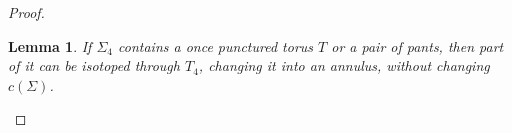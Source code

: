 \documentclass[12pt]{amsart}
\newtheorem{lema}{Lemma}
\begin{document}
\begin{proof}

\begin{lema} If $\Sigma_4$ contains a once punctured torus $T$ or a pair of pants, then part of it can be isotoped through $T_4$, changing it into an annulus, without changing $c(\Sigma)$. 
\end{lema}


\end{proof}
\end{document}
